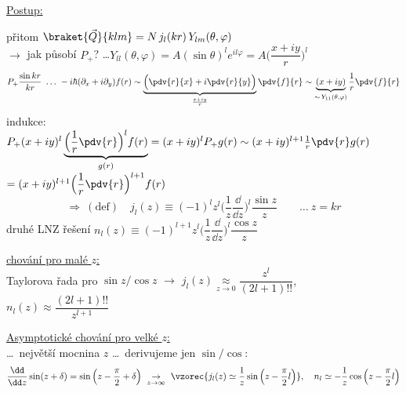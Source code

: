 \underline{Postup:}
\begin{center}
\end{center}
přitom \quad $\braket{\vec Q}{klm} = N\,j_l(kr)\,Y_{lm}(\theta,\varphi)$ \\
$\to$ jak působí $P_+$? \quad \dots \quad $Y_{ll}(\theta,\varphi) = A(\sin\theta)^le^{il\varphi} = A\Big(\dfrac{x+iy}{r}\Big)^l$
\[
  P_+\frac{\sin kr}{kr}\ \dots\ -i\hbar(\partial_x + i\partial_y)f(r) \sim \underbrace{\Big(\pdv{r}{x} + i\pdv{r}{y}\Big)}_{\frac{x+iy}{r}}\pdv{f}{r}
  \sim \underbrace{(x+iy)}_{\sim\,Y_{11}(\theta,\varphi)}\frac1r\pdv{f}{r}
\]
indukce: \quad
$P_+(x+iy)^l\underbrace{\Big(\frac1r\pdv{r}\Big)^lf(r)}_{g(r)} = (x+iy)^lP_+g(r) \sim (x+iy)^{l+1}\frac1r\pdv{r}g(r)$ \\
\hspace*{8cm} $= (x+iy)^{l+1}\Big(\dfrac1r\pdv{r}\Big)^{l+1}f(r)$
\[
  \Rightarrow\ (\text{def})\quad j_l(z) \equiv (-1)^lz^l\Big(\frac1z\frac{\dd}{\dd z}\Big)^l\frac{\sin z}{z} \qquad\dots\ z = kr
\]
druhé LNZ řešení \quad $n_l(z) \equiv (-1)^{l+1}z^l\Big(\dfrac1z\dfrac{\dd}{\dd z}\Big)^l\dfrac{\cos z}{z}$

\underline{chování pro malé $z$:} \\
\quad Taylorova řada pro $\sin z/\cos z$ \quad $\to$ \quad
$j_l(z) \underset{z\to0}{\approx} \dfrac{z^l}{(2l+1)!!}$, \qquad $n_l(z) \approx \dfrac{(2l+1)!!}{z^{l+1}}$

\underline{Asymptotické chování pro velké $z$:} \\
\dots\ největší mocnina $z$ \dots\ derivujeme jen $\sin/\cos$:
\[
  \frac{\dd}{\dd z}\sin(z+\delta) = \sin\Big(z - \frac{\pi}{2} + \delta\Big)
  \ \underset{z\to\infty}{\to}\
  \vzorec{j_l(z) \simeq \frac1z\sin\Big(z - \frac{\pi}{2}l\Big)},\quad n_l \simeq -\frac1z\cos\Big(z - \frac{\pi}{2}l\Big)
\]

